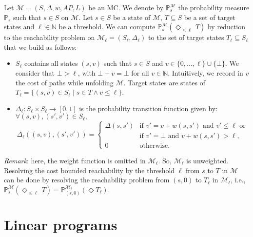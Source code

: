 Let $\mathcal{M} = (S, \Delta, w, AP, L)$ be an MC. We denote by $\mathbb{P}^\mathcal{M}_s$ the probability measure $\mathbb{P}_s$ such that $s \in S$ on $\mathcal{M}$.
Let $s \in S$ be a state of $\mathcal{M}$, $T \subseteq S$ be a set of target states and $\ell \in \mathbb{N}$ be a threshold.
We can compute $\mathbb{P}^{\mathcal{M}}_s(\Diamond_{\leq \ell}\, T)$ by reduction to the reachability problem on $\mathcal{M}_{\ell} = (S_{\ell}, \Delta_\ell)$ to the set of target states $T_\ell \subseteq S_\ell$ that we build as follows:
\begin{itemize}
	\item $S_\ell$ contains all states $(s, v)$ such that $s \in S $ and $v \in \{0, \dots, \ell\} \cup \{ \bot \}$. We consider that $\bot > \ell$, with $\bot + v = \bot$ for all $v \in \mathbb{N}$. Intuitively, we record in $v$ the cost of paths while unfolding $\mathcal{M}$. Target states are states of $T_\ell = \{ (s, v) \in S_\ell \; | \; s \in T \wedge v \leq \ell \}$.
	\item $\Delta_\ell: S_\ell \times S_\ell \rightarrow [0,1]$ is the probability transition function given by:\\
	$\forall (s, v), (s', v') \in S_\ell,$
	\[
		\Delta_\ell((s, v), (s', v')) =
		\begin{cases}
		\Delta(s, s') & \text{if $v' = v + w(s, s')$ and $v' \leq \ell$  or} \\
		 & \text{if $v' = \bot$ and $v + w(s, s') > \ell$}, \\
		 0 & \text{otherwise}.
		\end{cases}
	\]
\end{itemize}
\textit{Remark}: here, the weight function is omitted in $\mathcal{M}_\ell$. So, $\mathcal{M}_\ell$ is unweighted. \\
Resolving the cost bounded reachability by the threshold $\ell$ from $s$ to $T$ in $\mathcal{M}$ can be done by resolving the reachability problem from $(s, 0)$ to $T_\ell$ in $\mathcal{M}_\ell$, i.e., $\mathbb{P}^\mathcal{M}_s(\Diamond_{\leq \ell}\, T) = \mathbb{P}^{\mathcal{M}_\ell}_{(s, 0)}(\Diamond T_\ell)$.

\section{Linear programs}\label{LP-app}
